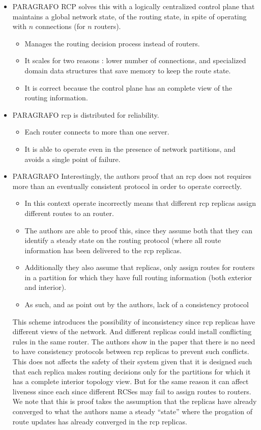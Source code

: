 \begin{itemize}
\item PARAGRAFO RCP solves this with a logically centralized control plane that maintains a  global network state, of the routing state, in spite of operating  with $n$ connections (for $n$ routers).  
  \begin{itemize}
  \item  Manages the routing decision process instead of routers. 
  \item  It scales for two reasons : lower number of connections, and specialized domain data structures that save memory to keep the route state. 
  \item It is correct because the control plane has an complete view of the routing information. 
  \end{itemize}

\item PARAGRAFO \gls{rcp} is distributed for reliability. 
  \begin{itemize}
  \item Each router connects to more than one server. 
  \item It is able to operate even in the presence of network partitions, and avoids a single point of failure. 
  \end{itemize}

\item PARAGRAFO Interestingly, the authors proof that an \gls{rcp} does not requires more than an eventually consistent protocol in order to operate correctly. 
  \begin{itemize}
  \item In this context operate incorrectly means that different \gls{rcp} replicas assign different routes to an router.
  \item The authors are able to proof this, since they assume both that they can identify a steady state on the routing protocol (where all route information has been delivered to the \gls{rcp} replicas. 
\item Additionally they also assume that replicas, only assign routes  for routers in a partition for which they have full routing information (both exterior and interior). 
\item As such, and as point out by the authors, lack of a consistency protocol 
  \end{itemize}

This scheme introduces the possibility of inconsistency since  \gls{rcp} replicas have different views of the network. 
And different replicas could install conflicting rules in the same router. 
The authors show in the paper that there is no need to have consistency protocols between \gls{rcp} replicas to prevent such conflicts. 
This does not affects the safety of their system given that it is designed such that each replica makes routing decisions only for the partitions for which it has a complete interior topology view. But for the same reason it can affect liveness since each since different RCSes may fail to assign routes to routers. 
We note that this is proof takes the assumption that the replicas have already converged to what the authors name a steady ``state''  where the progation of route updates has already converged in the \gls{rcp} replicas. 


\end{itemize}
